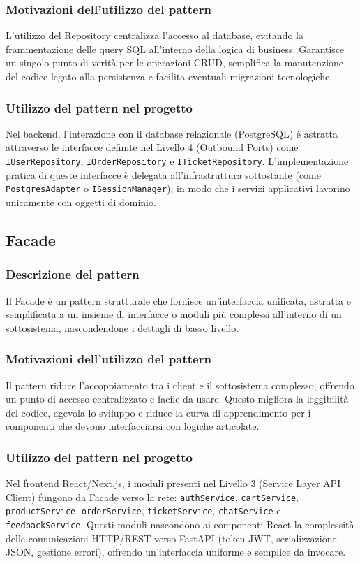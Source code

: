 \documentclass[a4paper, 11pt, oneside]{scrartcl}
\begin{document}
\subsubsection{Motivazioni dell'utilizzo del pattern}
L'utilizzo del Repository centralizza l'accesso al database, evitando la frammentazione delle query SQL all'interno della logica di business. Garantisce un singolo punto di verità per le operazioni CRUD, semplifica la manutenzione del codice legato alla persistenza e facilita eventuali migrazioni tecnologiche.

\subsubsection{Utilizzo del pattern nel progetto}
Nel backend, l'interazione con il database relazionale (PostgreSQL) è astratta attraverso le interfacce definite nel Livello 4 (Outbound Ports) come \texttt{IUserRepository}, \texttt{IOrderRepository} e \texttt{ITicketRepository}. L'implementazione pratica di queste interfacce è delegata all'infrastruttura sottostante (come \texttt{PostgresAdapter} o \texttt{ISessionManager}), in modo che i servizi applicativi lavorino unicamente con oggetti di dominio.

\subsection{Facade}

\subsubsection{Descrizione del pattern}
Il Facade è un pattern strutturale che fornisce un'interfaccia unificata, astratta e semplificata a un insieme di interfacce o moduli più complessi all'interno di un sottosistema, nascondendone i dettagli di basso livello.

\subsubsection{Motivazioni dell'utilizzo del pattern}
Il pattern riduce l'accoppiamento tra i client e il sottosistema complesso, offrendo un punto di accesso centralizzato e facile da usare. Questo migliora la leggibilità del codice, agevola lo sviluppo e riduce la curva di apprendimento per i componenti che devono interfacciarsi con logiche articolate.

\subsubsection{Utilizzo del pattern nel progetto}
Nel frontend React/Next.js, i moduli presenti nel Livello 3 (Service Layer API Client) fungono da Facade verso la rete: \texttt{authService}, \texttt{cartService}, \texttt{productService}, \texttt{orderService}, \texttt{ticketService}, \texttt{chatService} e \texttt{feedbackService}. Questi moduli nascondono ai componenti React la complessità delle comunicazioni HTTP/REST verso FastAPI (token JWT, serializzazione JSON, gestione errori), offrendo un'interfaccia uniforme e semplice da invocare.
\end{document}
